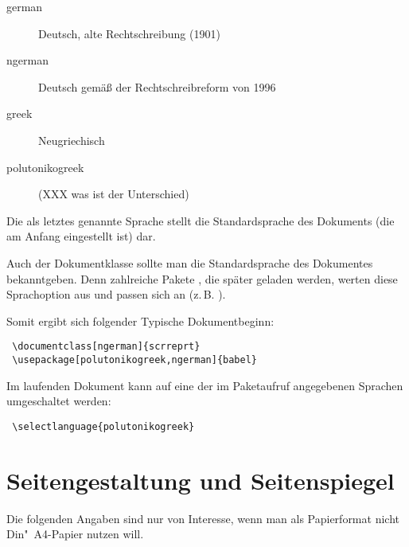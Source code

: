 \begin{description}
 \item[german] Deutsch, alte Rechtschreibung (1901)
 \item[ngerman] Deutsch gemäß der Rechtschreibreform von 1996
 \item[greek] Neugriechisch
 \item[polutonikogreek] (XXX was ist der Unterschied)
\end{description}

Die als letztes genannte Sprache stellt die Standardsprache des Dokuments (die am Anfang
eingestellt ist) dar.

Auch der Dokumentklasse sollte man die Standardsprache des Dokumentes bekanntgeben.
Denn zahlreiche Pakete , die später geladen werden, werten diese Sprachoption aus und 
passen sich an (z.\,B. ).

Somit ergibt sich folgender Typische Dokumentbeginn:

\begin{lstlisting}
 \documentclass[ngerman]{scrreprt}
 \usepackage[polutonikogreek,ngerman]{babel}
\end{lstlisting}


Im laufenden Dokument kann auf eine der im Paketaufruf angegebenen Sprachen umgeschaltet werden:

\begin{lstlisting} 
 \selectlanguage{polutonikogreek}
\end{lstlisting}






\section{Seitengestaltung und Seitenspiegel}
\label{komaskript}
 

Die folgenden Angaben sind nur von Interesse, wenn man als Papierformat nicht Din"~A4-Papier 
nutzen will.

\KOMAScript{}







